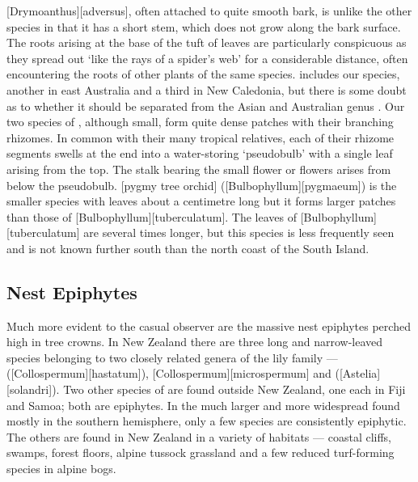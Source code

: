 [Drymoanthus][adversus], often attached to quite smooth bark, is unlike the other species in that it has a short stem, which does not grow along the bark surface.
The roots arising at the base of the tuft of leaves are particularly conspicuous as they spread out `like the rays of a spider's web' for a considerable distance, often encountering the roots of other plants of the same species.
 includes our species, another in east Australia and a third in New Caledonia, but there is some doubt as to whether it should be separated from the Asian and Australian genus .
Our two species of , although small, form quite dense patches with their branching rhizomes.
In common with their many tropical relatives, each of their rhizome segments swells at the end into a water-storing `pseudobulb' with a single leaf arising from the top.
The stalk bearing the small flower or flowers arises from below the pseudobulb.
[pygmy tree orchid] ([Bulbophyllum][pygmaeum]) is the smaller species with leaves about a centimetre long but it forms larger patches than those of [Bulbophyllum][tuberculatum].
The leaves of [Bulbophyllum][tuberculatum] are several times longer, but this species is less frequently seen and is not known further south than the north coast of the South Island.

\subsection{Nest Epiphytes}

Much more evident to the casual observer are the massive nest epiphytes perched high in tree crowns.
In New Zealand there are three long and narrow-leaved species belonging to two closely related genera of the lily family ---  ([Collospermum][hastatum]), [Collospermum][microspermum] and  ([Astelia][solandri]).
Two other species of  are found outside New Zealand, one each in Fiji and Samoa; both are epiphytes.
In the much larger and more widespread  found mostly in the southern hemisphere, only a few species are consistently epiphytic.
The others are found in New Zealand in a variety of habitats --- coastal cliffs, swamps, forest floors, alpine tussock grassland and a few reduced turf-forming species in alpine bogs.

